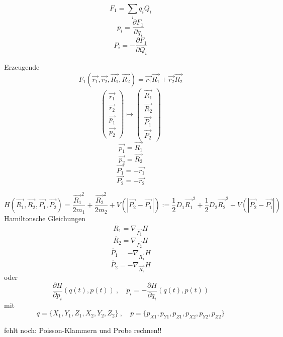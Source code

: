 \documentclass[10pt]{article} %
\begin{document}
\[ F_1 = \sum_iq_iQ_i \]
\[p_i = \frac{\partial F_1}{\partial q_i} \]
\[P_i = - \frac{\partial F_1}{\partial Q_i} \]

Erzeugende \[ F_1(\vec{r_1}, \vec{r_2},\vec{R_1},\vec{R_2}) = \vec{r_1}\vec{R_1} + \vec{r_2}\vec{R_2} \]
\[
\begin{pmatrix}
\vec{r_1} \\ \vec{r_2} \\ \vec{p_1} \\ \vec{p_2}
\end{pmatrix}
\mapsto
\begin{pmatrix}
\vec{R_1} \\ \vec{R_2} \\ \vec{P_1} \\ \vec{P_2}
\end{pmatrix}
\]
\[ \vec{p_1} = \vec{R_1} \]
\[ \vec{p_2} = \vec{R_2} \]
\[ \vec{P_1} = -\vec{r_1} \]
\[ \vec{P_2} = -\vec{r_2} \]

\[
H(\vec{R_1},\vec{R_2},\vec{P_1},\vec{P_2}) = 
\frac{\vec{R_1}^2}{2m_1} +  \frac{\vec{R_2}^2}{2m_2}
+ V(\left| \vec{P_2} - \vec{P_1} \right|) 
:= \frac{1}{2}D_1\vec{R_1}^2 + \frac{1}{2}D_2\vec{R_2}^2 + V(\left| \vec{P_2} - \vec{P_1} \right|)
\]
Hamiltonsche Gleichungen
\[ \dot{R_1} = \nabla_{\vec{P_1}} H \]
\[ \dot{R_2} = \nabla_{\vec{P_2}} H \]
\[ \dot{P_1} = - \nabla_{\vec{R_1}} H \]
\[ \dot{P_2} = - \nabla_{\vec{R_2}} H \]
oder
\[ \frac{\partial H}{\partial p_{i}}(q(t),p(t))\ ,\quad \dot{p}_{i}=-\frac{\partial H}{\partial q_{i}}(q(t),p(t)) \] 
mit
\[ q = \{ X_1, Y_1, Z_1, X_2, Y_2, Z_2 \} \ , \quad p = \{ p_{X1}, p_{Y1}, p_{Z1}, p_{X2}, p_{Y2}, p_{Z2} \} \]

fehlt noch: Poisson-Klammern und Probe rechnen!!
\end{document}
